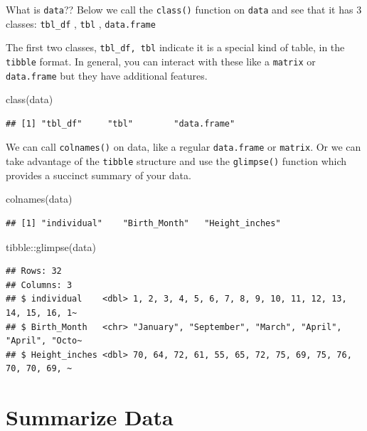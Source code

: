 \documentclass[
]{book}
\newenvironment{Shaded}{\begin{snugshade}}{\end{snugshade}}
\newcommand{\FunctionTok}[1]{\textcolor[rgb]{0.00,0.00,0.00}{#1}}
\newcommand{\NormalTok}[1]{#1}
\newcommand{\SpecialCharTok}[1]{\textcolor[rgb]{0.00,0.00,0.00}{#1}}
\begin{document}
What is \texttt{data}?? Below we call the \texttt{class()} function on \texttt{data} and see that it has 3 classes:
\texttt{tbl\_df} , \texttt{tbl} , \texttt{data.frame}

The first two classes, \texttt{tbl\_df,\ tbl} indicate it is a special kind of table, in the \texttt{tibble} format. In general, you can interact with these like a \texttt{matrix} or \texttt{data.frame} but they have additional features.

\begin{Shaded}
\begin{Highlighting}[]
\FunctionTok{class}\NormalTok{(data)}
\end{Highlighting}
\end{Shaded}

\begin{verbatim}
## [1] "tbl_df"     "tbl"        "data.frame"
\end{verbatim}

We can call \texttt{colnames()} on data, like a regular \texttt{data.frame} or \texttt{matrix}. Or we can take advantage of the \texttt{tibble} structure and use the \texttt{glimpse()} function which provides a succinct summary of your data.

\begin{Shaded}
\begin{Highlighting}[]
\FunctionTok{colnames}\NormalTok{(data)}
\end{Highlighting}
\end{Shaded}

\begin{verbatim}
## [1] "individual"    "Birth_Month"   "Height_inches"
\end{verbatim}

\begin{Shaded}
\begin{Highlighting}[]
\NormalTok{tibble}\SpecialCharTok{::}\FunctionTok{glimpse}\NormalTok{(data)}
\end{Highlighting}
\end{Shaded}

\begin{verbatim}
## Rows: 32
## Columns: 3
## $ individual    <dbl> 1, 2, 3, 4, 5, 6, 7, 8, 9, 10, 11, 12, 13, 14, 15, 16, 1~
## $ Birth_Month   <chr> "January", "September", "March", "April", "April", "Octo~
## $ Height_inches <dbl> 70, 64, 72, 61, 55, 65, 72, 75, 69, 75, 76, 70, 70, 69, ~
\end{verbatim}

\hypertarget{summarize-data}{%
\section*{Summarize Data}\label{summarize-data}}
\end{document}
